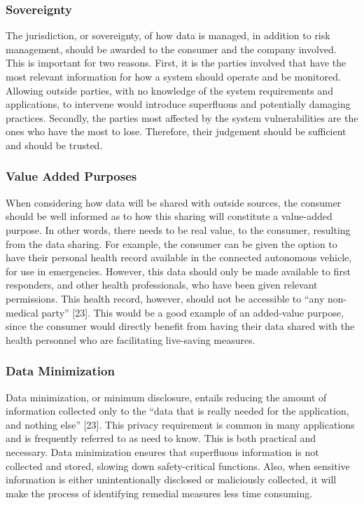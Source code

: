 \documentclass[conference,compsoc]{IEEEtran}
\begin{document}
\subsubsection{Sovereignty}
The jurisdiction, or sovereignty, of how data is managed, in addition to risk management, should be awarded to the consumer and the company involved. This is important for two reasons. First, it is the parties involved that have the most relevant information for how a system should operate and be monitored. Allowing outside parties, with no knowledge of the system requirements and applications, to intervene would introduce superfluous and potentially damaging practices. Secondly, the parties most affected by the system vulnerabilities are the ones who have the most to lose. Therefore, their judgement should be sufficient and should be trusted.

\subsubsection{Value Added Purposes}
When considering how data will be shared with outside sources, the consumer should be well informed as to how this sharing will constitute a value-added purpose. In other words, there needs to be real value, to the consumer, resulting from the data sharing. For example, the consumer can be given the option to have their personal health record available in the connected autonomous vehicle, for use in emergencies. However, this data should only be made available to first responders, and other health professionals, who have been given relevant permissions. This health record, however, should not be accessible to “any non-medical party” [23]. This would be a good example of an added-value purpose, since the consumer would directly benefit from having their data shared with the health personnel who are facilitating live-saving measures.

\subsubsection{Data Minimization}
Data minimization, or minimum disclosure, entails reducing the amount of information collected only to the “data that is really needed for the application, and nothing else” [23]. This privacy requirement is common in many applications and is frequently referred to as need to know. This is both practical and necessary. Data minimization ensures that superfluous information is not collected and stored, slowing down safety-critical functions. Also, when sensitive information is either unintentionally disclosed or maliciously collected, it will make the process of identifying remedial measures less time consuming.
\end{document}
